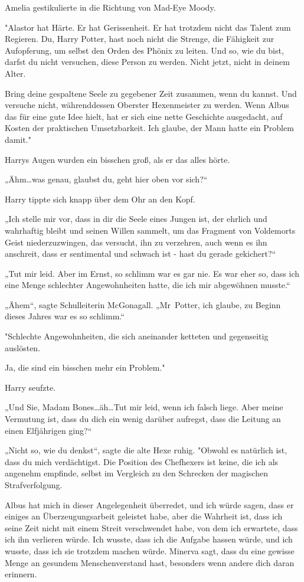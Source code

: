 {Amelia gestikulierte in die Richtung von Mad-Eye Moody.

"Alastor hat Härte. Er hat Gerissenheit. Er hat trotzdem nicht das Talent zum Regieren. Du, Harry Potter, hast noch nicht die Strenge, die Fähigkeit zur Aufopferung, um selbst den Orden des Phönix zu leiten. Und so, wie du bist, darfst du nicht versuchen, diese Person zu werden. Nicht jetzt, nicht in deinem Alter.

Bring deine gespaltene Seele zu gegebener Zeit zusammen, wenn du kannst. Und versuche nicht, währenddessen Oberster Hexenmeister zu werden. Wenn Albus das für eine gute Idee hielt, hat er sich eine nette Geschichte ausgedacht, auf Kosten der praktischen Umsetzbarkeit. Ich glaube, der Mann hatte ein Problem damit."

Harrys Augen wurden ein bisschen groß, als er das alles hörte.

„Ähm…was genau, glaubst du, geht hier oben vor sich?“

Harry tippte sich knapp über dem Ohr an den Kopf.

„Ich stelle mir vor, dass in dir die Seele eines Jungen ist, der ehrlich und wahrhaftig bleibt und seinen Willen sammelt, um das Fragment von Voldemorts Geist niederzuzwingen, das versucht, ihn zu verzehren, auch wenn es ihn anschreit, dass er sentimental und schwach ist - hast du gerade gekichert?“

„Tut mir leid. Aber im Ernst, so schlimm war es gar nie. Es war eher so, dass ich eine Menge schlechter Angewohnheiten hatte, die ich mir abgewöhnen musste.“

„Ähem“, sagte Schulleiterin McGonagall. „Mr~Potter, ich glaube, zu Beginn dieses Jahres war es so schlimm.“

"Schlechte Angewohnheiten, die sich aneinander ketteten und gegenseitig auslösten.

Ja, die sind ein bisschen mehr ein Problem."

Harry seufzte.

„Und Sie, Madam Bones…äh…Tut mir leid, wenn ich falsch liege. Aber meine Vermutung ist, dass du dich ein wenig darüber aufregst, dass die Leitung an einen Elfjährigen ging?“

„Nicht so, wie du denkst“, sagte die alte Hexe ruhig. "Obwohl es natürlich ist, dass du mich verdächtigst. Die Position des Chefhexers ist keine, die ich als angenehm empfinde, selbst im Vergleich zu den Schrecken der magischen Strafverfolgung.

Albus hat mich in dieser Angelegenheit überredet, und ich würde sagen, dass er einiges an Überzeugungsarbeit geleistet habe, aber die Wahrheit ist, dass ich seine Zeit nicht mit einem Streit verschwendet habe, von dem ich erwartete, dass ich ihn verlieren würde. Ich wusste, dass ich die Aufgabe hassen würde, und ich wusste, dass ich sie trotzdem machen würde. Minerva sagt, dass du eine gewisse Menge an gesundem Menschenverstand hast, besonders wenn andere dich daran erinnern.

}
